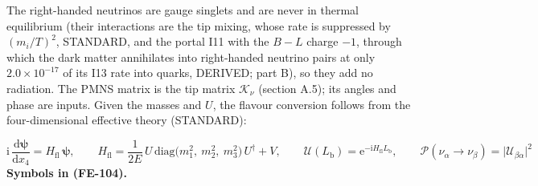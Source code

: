 \documentclass[
  10pt,
]{article}
\begin{document}
The right-handed neutrinos are gauge singlets and are never in thermal
equilibrium (their interactions are the tip mixing, whose rate is
suppressed by \((m_i/T)^2\), STANDARD, and the portal I11 with the
\(B - L\) charge \(-1\), through which the dark matter annihilates into
right-handed neutrino pairs at only \(2.0\times10^{-17}\) of its I13
rate into quarks, DERIVED; part B), so they add no radiation. The PMNS
matrix is the tip matrix \(\mathcal{K}_\nu\) (section A.5); its angles
and phase are inputs. Given the masses and \(U\), the flavour conversion
follows from the four-dimensional effective theory (STANDARD):

\[
\mathrm{i}\,\frac{\mathrm{d}\boldsymbol{\psi}}{\mathrm{d}x_4} = H_{\mathrm{fl}}\,\boldsymbol{\psi},\qquad
H_{\mathrm{fl}} = \frac{1}{2E}\,U\,\mathrm{diag}\big(m_1^2,\ m_2^2,\ m_3^2\big)\,U^\dagger + V,\qquad
\mathcal{U}(L_{\mathrm{b}}) = \mathrm{e}^{-\mathrm{i}H_{\mathrm{fl}}L_{\mathrm{b}}},\qquad
\mathcal{P}(\nu_\alpha\to\nu_\beta) = \lvert\mathcal{U}_{\beta\alpha}\rvert^2 \tag{FE-104}
\] \textbf{Symbols in (FE-104).}
\end{document}
